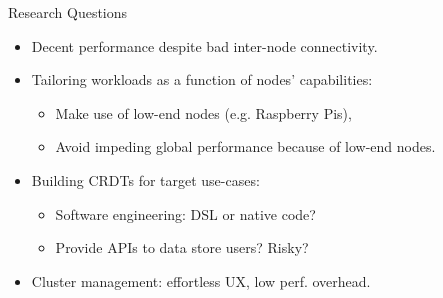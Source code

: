 \begin{frame}{Research Questions}

\begin{itemize}
	\item Decent performance despite bad inter-node connectivity.
	\vfill

	\item Tailoring workloads as a function of nodes' capabilities:

	\begin{itemize}
		\item Make use of low-end nodes (e.g. Raspberry Pis),
		\item Avoid impeding global performance because of low-end nodes.
	\end{itemize}
	\vfill

	\item Building CRDTs for target use-cases:

	\begin{itemize}
		\item Software engineering: DSL or native code?
		\item Provide APIs to data store users? Risky?
	\end{itemize}
	\vfill

	\item Cluster management: effortless UX, low perf. overhead.
\end{itemize}
\end{frame}